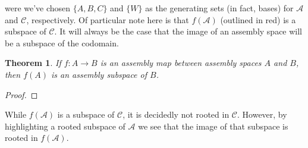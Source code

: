 \documentclass[aps,prd,onecolumn,nofootinbib,letterpaper,preprintnumbers,superscriptaddress,eqsecnum]{revtex4}
\newtheorem{theorem}{Theorem}
\theoremstyle{definition}
\newcommand{\C}{\mathcal{C}}
\newcommand{\A}{\mathcal{A}}
\newcommand{\red}[1]{{\color{red}#1}}
\newcommand{\TODO}[1]{\noindent\red{\textbf{TODO:}~#1}}
\begin{document}
\begin{center}
{
    }
\end{center}
were we've chosen $\{A,B,C\}$ and $\{W\}$ as the generating sets (in fact, bases) for $\A$ and $\C$, respectively.
Of particular note here is that $f(\A)$ (outlined in red) is a subspace of $\C$.
It will always be the case that the image of an assembly space will be a subspace of the codomain.
\begin{theorem}\label{lem:assembly-image-is-subspace}
    If $f : A \rightarrow B$ is an assembly map between assembly spaces $A$ and $B$, then $f(A)$ is an assembly subspace of $B$.
\end{theorem}
\begin{proof}
    \TODO{Complete}
\end{proof}
While $f(\A)$ is a subspace of $\C$, it is decidedly not rooted in $\C$.
However, by highlighting a rooted subspace of $\A$ we see that the image of that subspace is rooted in $f(\A)$.
\end{document}
